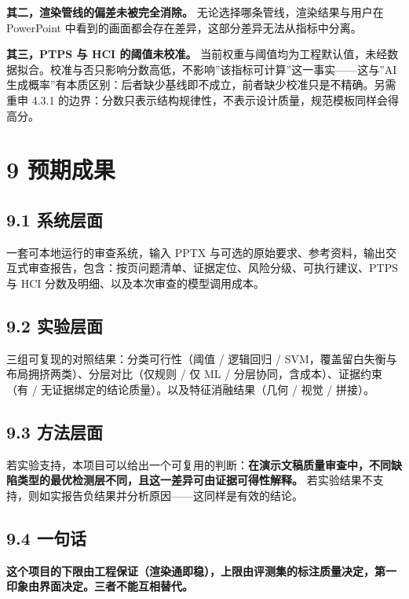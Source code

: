 \documentclass[
  11pt,
]{article}
\begin{document}
\textbf{其二，渲染管线的偏差未被完全消除。}
无论选择哪条管线，渲染结果与用户在 PowerPoint
中看到的画面都会存在差异，这部分差异无法从指标中分离。

\textbf{其三，PTPS 与 HCI 的阈值未校准。}
当前权重与阈值均为工程默认值，未经数据拟合。校准与否只影响分数高低，不影响''该指标可计算''这一事实------这与''AI
生成概率''有本质区别：后者缺少基线即不成立，前者缺少校准只是不精确。另需重申
4.3.1
的边界：分数只表示结构规律性，不表示设计质量，规范模板同样会得高分。

\section{9 预期成果}\label{ux9884ux671fux6210ux679c}

\subsection{9.1 系统层面}\label{ux7cfbux7edfux5c42ux9762}

一套可本地运行的审查系统，输入 PPTX
与可选的原始要求、参考资料，输出交互式审查报告，包含：按页问题清单、证据定位、风险分级、可执行建议、PTPS
与 HCI 分数及明细、以及本次审查的模型调用成本。

\subsection{9.2 实验层面}\label{ux5b9eux9a8cux5c42ux9762}

三组可复现的对照结果：分类可行性（阈值 / 逻辑回归 /
SVM，覆盖留白失衡与布局拥挤两类）、分层对比（仅规则 / 仅 ML /
分层协同，含成本）、证据约束（有 /
无证据绑定的结论质量）。以及特征消融结果（几何 / 视觉 / 拼接）。

\subsection{9.3 方法层面}\label{ux65b9ux6cd5ux5c42ux9762}

若实验支持，本项目可以给出一个可复用的判断：\textbf{在演示文稿质量审查中，不同缺陷类型的最优检测层不同，且这一差异可由证据可得性解释。}
若实验结果不支持，则如实报告负结果并分析原因------这同样是有效的结论。

\subsection{9.4 一句话}\label{ux4e00ux53e5ux8bdd}

\textbf{这个项目的下限由工程保证（渲染通即稳），上限由评测集的标注质量决定，第一印象由界面决定。三者不能互相替代。}
\end{document}

